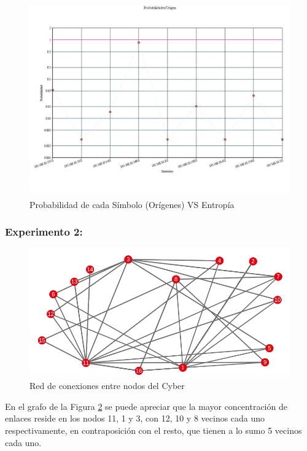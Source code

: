 \begin{figure}[H]
  \centering
    \includegraphics[scale=0.45]{imagenes/graficos/Probabilidades/06origen.jpg}
  \caption{Probabilidad de cada Símbolo (Orígenes) VS Entropía }
  \label{fig:18}
\end{figure}

\subsubsection{Experimento 2:}

\begin{figure}[H]
  \centering
    \includegraphics[scale=0.75]{imagenes/graficos/grafos/cyber.png}
  \caption{Red de conexiones entre nodos del Cyber}
  \label{fig:19}
\end{figure}

En el grafo de la Figura \ref{fig:19} se puede apreciar que la mayor concentración de enlaces reside en los nodos 11, 1 y 3, con 12, 10 y 8 vecinos cada uno respectivamente, en contraposición con el resto, que tienen a lo sumo 5 vecinos cada uno.
